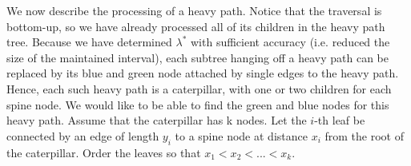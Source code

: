 \documentclass[11pt,a4paper]{article}
\theoremstyle{definition}
\theoremstyle{remark}
\begin{document}
We now describe the processing of a heavy path. Notice that the traversal is bottom-up, so we have already processed all of its children in the heavy path tree. Because we have determined $\lambda^*$ with sufficient accuracy (i.e. reduced the size of the maintained interval), each subtree hanging off a heavy path can be replaced by its blue and green node attached by single edges to the heavy path. Hence, each such heavy path is a caterpillar, with one or two children for each spine node. We would like to be able to find the green and blue nodes for this heavy path. %
Assume that the caterpillar has k nodes. Let the $i$-th leaf be connected by an edge of length $y_i$ to a spine node at distance $x_i$ from the root of the caterpillar. Order the leaves so that $x_1 < x_2 < ... < x_k$.
\end{document}
